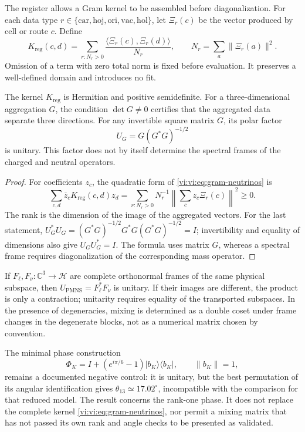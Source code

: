 The register allows a Gram kernel to be assembled before diagonalization.
For each data type
\(r\in\{\mathrm{car},\mathrm{hoj},\mathrm{ori},\mathrm{vac},\mathrm{hol}\}\),
let \(\Xi_r(c)\) be the vector produced by cell or route \(c\).
Define
\begin{equation}
 K_{\mathrm{reg}}(c,d)=
 \sum_{r:N_r>0}\frac{\langle\Xi_r(c),\Xi_r(d)\rangle}{N_r},
 \qquad N_r=\sum_a\|\Xi_r(a)\|^2.
 \label{vi:vi:eq:gram-neutrinos}
\end{equation}
Omission of a term with zero total norm is fixed before
evaluation. It preserves a well-defined domain and introduces no fit.

\begin{proposition}
\label{vi:vi:prop:gram-neutrinos}
The kernel \(K_{\mathrm{reg}}\) is Hermitian and positive semidefinite.
For a three-dimensional aggregation \(G\), the condition \(\det G\ne0\)
certifies that the aggregated data separate three directions. For any
invertible square matrix \(G\), its polar factor
\[
 U_G=G(G^*G)^{-1/2}
\]
is unitary. This factor does not by itself determine the spectral frames
of the charged and neutral operators.
\end{proposition}
\begin{proof}
For coefficients \(z_c\), the quadratic form of
\eqref{vi:vi:eq:gram-neutrinos} is
\[
 \sum_{c,d}\overline z_cK_{\mathrm{reg}}(c,d)z_d
 =\sum_{r:N_r>0}N_r^{-1}
 \left\|\sum_c z_c\Xi_r(c)\right\|^2\ge0.
\]
The rank is the dimension of the image of the aggregated vectors. For the
last statement,
\(U_G^*U_G=(G^*G)^{-1/2}G^*G(G^*G)^{-1/2}=I\);
invertibility and equality of dimensions also give \(U_GU_G^*=I\).
The formula uses matrix \(G\), whereas a spectral frame requires
diagonalization of the corresponding mass operator.
\end{proof}

If \(F_\ell,F_\nu:\mathbb C^3\to\mathcal H\) are complete orthonormal
frames of the same physical subspace, then
\(U_{\mathrm{PMNS}}=F_\ell^*F_\nu\) is unitary. If their images are
different, the product is only a contraction; unitarity requires
equality of the transported subspaces. In the presence of degeneracies,
mixing is determined as a double coset under frame changes in
the degenerate blocks, not as a numerical matrix chosen by convention.

The minimal phase construction
\[
 \Phi_K=I+(e^{i\pi/6}-1)|b_K\rangle\langle b_K|,
 \qquad\|b_K\|=1,
\]
remains a documented negative control: it is unitary, but the best
permutation of its angular identification gives
\(\theta_{13}\simeq17.02^\circ\), incompatible with the comparison for that
reduced model. The result concerns the rank-one phase. It does not
replace the complete kernel \eqref{vi:vi:eq:gram-neutrinos}, nor permit a mixing
matrix that has not passed its own rank and angle checks
to be presented as validated.

